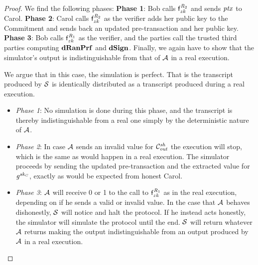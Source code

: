 \begin{proof}
    We find the following phases:
    \textbf{Phase 1}: Bob calls $\mathsf{f}^{\mathit{R}_2}_{zk}$ and sends $\mathit{ptx}$ to Carol.
    \textbf{Phase 2}: Carol calls $\mathsf{f}^{\mathit{R}_2}_{zk}$ as the verifier adds her public key to the Commitment and sends back an updated pre-transaction and her public key.
    \textbf{Phase 3}: Bob calls $\mathsf{f}^{\mathit{R}_1}_{zk}$ as the verifier, and the parties call the trusted third parties computing $\mathbf{dRanPrf}$ and $\mathbf{dSign}$.
    Finally, we again have to show that the simulator's output is indistinguishable from that of $\mathcal{A}$ in a real execution.

    We argue that in this case, the simulation is perfect.
    That is the transcript produced by $\mathcal{S}$ is identically distributed as a transcript produced during a real execution.
    \begin{itemize}
        \item \textit{Phase 1}: No simulation is done during this phase, and the transcript is thereby indistinguishable from a real one simply by the deterministic nature of $\mathcal{A}$.
        \item \textit{Phase 2}: In case $\mathcal{A}$ sends an invalid value for $\mathcal{C}_{\mathit{out}}^{\mathit{sh}}$ the execution will stop, which is the same as would happen in a real execution.
        The simulator proceeds by sending the updated pre-transaction and the extracted value for $\mathit{g}^{\mathit{sk}_{\mathit{C}}}$, exactly as would be expected from honest Carol.
        \item \textit{Phase 3}: $\mathcal{A}$ will receive 0 or 1 to the call to $\mathsf{f}^{\mathit{R}_1}_{zk}$ as in the real execution, depending on if he sends a valid or invalid value.
        In the case that $\mathcal{A}$ behaves dishonestly, $\mathcal{S}$ will notice and halt the protocol.
        If he instead acts honestly, the simulator will simulate the protocol until the end.
        $\mathcal{S}$ will return whatever $\mathcal{A}$ returns making the output indistinguishable from an output produced by $\mathcal{A}$ in a real execution.
    \end{itemize}


\end{proof}
